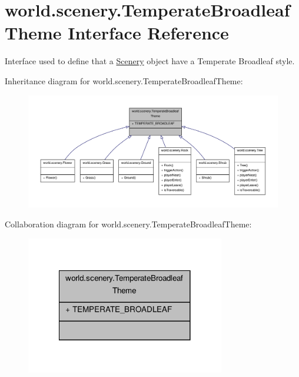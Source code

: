 \hypertarget{interfaceworld_1_1scenery_1_1_temperate_broadleaf_theme}{\section{world.\-scenery.\-Temperate\-Broadleaf\-Theme Interface Reference}
\label{interfaceworld_1_1scenery_1_1_temperate_broadleaf_theme}
}


Interface used to define that a \hyperlink{classworld_1_1scenery_1_1_scenery}{Scenery} object have a Temperate Broadleaf style.  




Inheritance diagram for world.\-scenery.\-Temperate\-Broadleaf\-Theme\-:
\nopagebreak
\begin{figure}[H]
\begin{center}
\leavevmode
\includegraphics[width=350pt]{interfaceworld_1_1scenery_1_1_temperate_broadleaf_theme__inherit__graph}
\end{center}
\end{figure}


Collaboration diagram for world.\-scenery.\-Temperate\-Broadleaf\-Theme\-:
\nopagebreak
\begin{figure}[H]
\begin{center}
\leavevmode
\includegraphics[width=246pt]{interfaceworld_1_1scenery_1_1_temperate_broadleaf_theme__coll__graph}
\end{center}
\end{figure}

